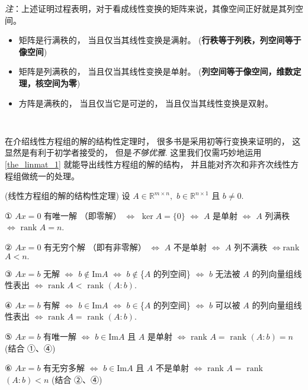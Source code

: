 \textsl{注}：上述证明过程表明，对于看成线性变换的矩阵来说，其像空间正好就是其列空间。 

\begin{itemize}
\item 矩阵是行满秩的， 当且仅当其线性变换是满射。 (\textbf{行秩等于列秩，列空间等于像空间})
\end{itemize}

\begin{itemize}
\item 矩阵是列满秩的， 当且仅当其线性变换是单射。 (\textbf{列空间等于像空间，维数定理，核空间为零})
\end{itemize}

\begin{itemize}
\item 方阵是满秩的， 当且仅当它是可逆的， 当且仅当其线性变换是双射。 \end{itemize}
\verb| |

在介绍线性方程组的解的结构性定理时， 很多书是采用初等行变换来证明的， 这显然是有利于初学者接受的， 但是\textsl{不够优雅}. 这里我们仅需巧妙地运用 \autoref{the_linmat_1} 就能导出线性方程组的解的结构，
并且能对齐次和非齐次线性方程组做统一的处理。 

\begin{theorem}{(线性方程组的解的结构性定理)}\label{the_linmat_2}
设 $A\in\mathbb{R}^{m\times n},$ $b\in\mathbb{R}^{n\times1}$ 且 $b\neq0$.

① $Ax=0$ 有唯一解 （即零解） $\Leftrightarrow$ $\ker A=\{0\}$ $\Leftrightarrow$
$A$ 是单射 $\Leftrightarrow$ $A$ 列满秩 $\Leftrightarrow$ $\mathrm{rank}$
$A=n.$ 

② $Ax=0$ 有无穷个解 （即有非零解） $\Leftrightarrow$ $A$ 不是单射 $\Leftrightarrow$
$A$ 列不满秩 $\Leftrightarrow\mathrm{rank}$ $A<n.$ 

③ $Ax=b$ 无解 $\Leftrightarrow$ $b\notin\mathrm{Im}A$ $\Leftrightarrow$
$b\notin$\{$A$ 的列空间\} $\Leftrightarrow$ $b$ 无法被 $A$ 的列向量组线性表出
$\Leftrightarrow$ $\mathrm{rank}$ $A<$ $\mathrm{rank}$ $(A:b).$

④ $Ax=b$ 有解 $\Leftrightarrow$ $b\in\mathrm{Im}A$ $\Leftrightarrow$
$b\in$\{$A$ 的列空间\} $\Leftrightarrow$ $b$ 可以被 $A$ 的列向量组线性表出 $\Leftrightarrow$
$\mathrm{rank}$ $A=$ $\mathrm{rank}$ $(A:b).$

⑤ $Ax=b$ 有唯一解 $\Leftrightarrow$ $b\in\mathrm{Im}A$ 且 $A$ 是单射 $\Leftrightarrow$
$\mathrm{rank}$ $A=$ $\mathrm{rank}$ $(A:b)=n$ (结合 ①、④)

⑥ $Ax=b$ 有无穷多解 $\Leftrightarrow$ $b\in\mathrm{Im}A$ 且 $A$ 不是单射
$\Leftrightarrow$ $\mathrm{rank}$ $A=$ $\mathrm{rank}$ $(A:b)<n$
(结合 ②、④)
\end{theorem}

